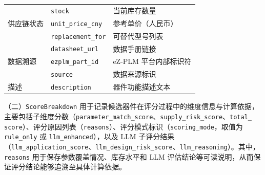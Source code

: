 \begin{table}[htbp]
\begin{tabularx}{\textwidth}{p{2cm}p{4cm}X}
\multirow{3}{*}{供应链状态}
& \texttt{stock} & 当前库存数量 \\
& \texttt{unit\_price\_cny} & 参考单价（人民币） \\
& \texttt{replacement\_for} & 可替代型号列表 \\
\midrule

\multirow{3}{*}{数据溯源}
& \texttt{datasheet\_url} & 数据手册链接 \\
& \texttt{ezplm\_part\_id} & eZ-PLM 平台内部标识符 \\
& \texttt{source} & 数据来源标识 \\
\midrule

描述
& \texttt{description} & 器件功能描述文本 \\
\bottomrule
\end{tabularx}
\end{table}

（二）\texttt{ScoreBreakdown} 用于记录候选器件在评分过程中的维度信息与计算依据，主要包括子维度分数（\texttt{parameter\_match\_score}、\texttt{supply\_risk\_score}、\texttt{total\_\\score}）、评分原因列表（\texttt{reasons}）、评分模式标识（\texttt{scoring\_mode}，取值为 \texttt{rule\_only} 或 \texttt{llm\_enhanced}），以及 LLM 子评分结果（\texttt{llm\_application\_score}、\texttt{llm\_design\_risk\_score}、\texttt{llm\_reasoning}）。其中，\texttt{reasons} 用于保存参数覆盖情况、库存水平和 LLM 评估结论等可读说明，从而保证评分结论能够追溯至具体计算依据。

